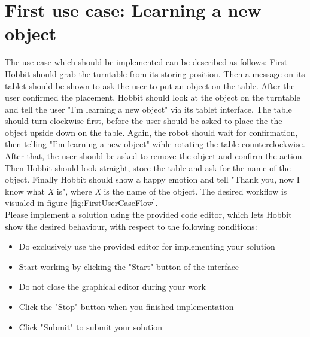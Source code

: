 \documentclass[a4paper,12pt]{article}
\begin{document}
\section*{First use case: Learning a new object}
The use case which should be implemented can be described as follows: First Hobbit should grab the turntable from its storing position. Then a message on its tablet should be shown to ask the user to put an object on the table. After the user confirmed the placement, Hobbit should look at the object on the turntable and tell the user "I'm learning a new object" via its tablet interface. The table should turn clockwise first, before the user should be asked to place the the object upside down on the table. Again, the robot should wait for confirmation, then telling "I'm learning a new object" wihle rotating the table counterclockwise. After that, the user should be asked to remove the object and confirm the action. Then Hobbit should look straight, store the table and ask for the name of the object. Finally Hobbit should show a happy emotion and tell "Thank you, now I know what \textit{X} is", where \textit{X} is the name of the object. The desired workflow is visualed in figure \ref{fig:FirstUserCaseFlow}. \\

Please implement a solution using the provided code editor, which lets Hobbit show the desired behaviour, with respect to the following conditions:
\begin{itemize}
    \item Do exclusively use the provided editor for implementing your solution
    \item Start working by clicking the "Start" button of the interface
    \item Do not close the graphical editor during your work
    \item Click the "Stop" button when you finished implementation
    \item Click "Submit" to submit your solution
\end{itemize}
\end{document}
